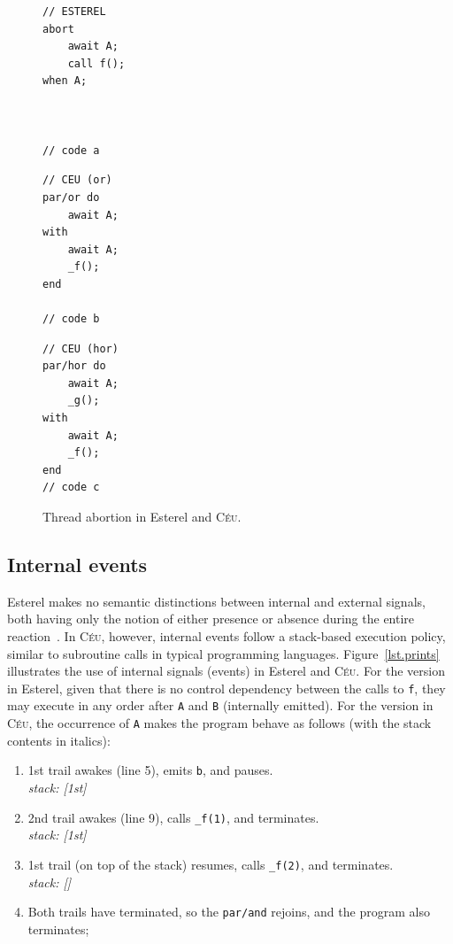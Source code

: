 \documentclass{sigplanconf}
\newcommand{\CEU}{\textsc{C\'{e}u}\xspace}
\newcommand{\code}[1] {{\small{\texttt{#1}}}}
\newcommand{\1}{\;}
\newcommand{\2}{\;\;}
\newcommand{\3}{\;\;\;}
\newcommand{\5}{\;\;\;\;\;}
\begin{document}
\begin{figure}[t]
\begin{minipage}[t]{0.32\linewidth}
\begin{lstlisting}
// ESTEREL
abort
    await A;
    call f();
when A;



// code a
\end{lstlisting}
\end{minipage}
%
\begin{minipage}[t]{0.32\linewidth}
\begin{lstlisting}
// CEU (or)
par/or do
    await A;
with
    await A;
    _f();
end

// code b
\end{lstlisting}
\end{minipage}
%
\begin{minipage}[t]{0.32\linewidth}
\begin{lstlisting}
// CEU (hor)
par/hor do
    await A;
    _g();
with
    await A;
    _f();
end
// code c
\end{lstlisting}
\end{minipage}
\caption{ Thread abortion in Esterel and \CEU. %
\label{lst.abortion}
}
\end{figure}

\subsection{Internal events}
\label{sec.ceu.ints}

Esterel makes no semantic distinctions between internal and external signals, 
both having only the notion of either presence or absence during the entire 
reaction~\cite{esterel.preemption}.
%
In \CEU, however, internal events follow a stack-based execution policy, 
similar to subroutine calls in typical programming languages.
%
Figure~\ref{lst.prints} illustrates the use of internal signals (events) in 
Esterel and \CEU.
%
For the version in Esterel, given that there is no control dependency between 
the calls to \code{f}, they may execute in any order after \code{A} and 
\code{B} (internally emitted).
%
For the version in \CEU, the occurrence of \code{A} makes the program behave as 
follows (with the stack contents in italics):
%
{\small
\begin{enumerate}
\setlength{\itemsep}{0pt}
\item 1st trail awakes (line 5), emits \code{b}, and pauses.\\
    \emph{stack: [1st]}
\item 2nd trail awakes (line 9), calls \code{\_f(1)}, and terminates.\\
    \emph{stack: [1st]}
\item 1st trail (on top of the stack) resumes, calls \code{\_f(2)}, and 
    terminates.\\
    \emph{stack: []}
\item Both trails have terminated, so the \code{par/and} rejoins, and the 
program also terminates;
\end{enumerate}
}
\end{document}
